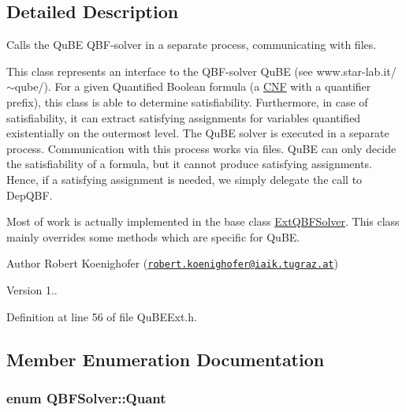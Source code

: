 \subsection{Detailed Description}
Calls the Qu\-B\-E Q\-B\-F-\/solver in a separate process, communicating with files. 

This class represents an interface to the Q\-B\-F-\/solver Qu\-B\-E (see www.\-star-\/lab.\-it/$\sim$qube/). For a given Quantified Boolean formula (a \hyperlink{classCNF}{C\-N\-F} with a quantifier prefix), this class is able to determine satisfiability. Furthermore, in case of satisfiability, it can extract satisfying assignments for variables quantified existentially on the outermost level. The Qu\-B\-E solver is executed in a separate process. Communication with this process works via files. Qu\-B\-E can only decide the satisfiability of a formula, but it cannot produce satisfying assignments. Hence, if a satisfying assignment is needed, we simply delegate the call to Dep\-Q\-B\-F.

Most of work is actually implemented in the base class \hyperlink{classExtQBFSolver}{Ext\-Q\-B\-F\-Solver}. This class mainly overrides some methods which are specific for Qu\-B\-E.

\begin{DoxyAuthor}{Author}
Robert Koenighofer (\href{mailto:robert.koenighofer@iaik.tugraz.at}{\tt robert.\-koenighofer@iaik.\-tugraz.\-at}) 
\end{DoxyAuthor}
\begin{DoxyVersion}{Version}
1.. 
\end{DoxyVersion}


Definition at line 56 of file Qu\-B\-E\-Ext.\-h.



\subsection{Member Enumeration Documentation}
\hypertarget{classQBFSolver_ac091e263cb55286cc07b2451bcf4d3c7}{
\subsubsection[{Quant}]{\setlength{\rightskip}{0pt plus 5cm}enum {\bf Q\-B\-F\-Solver\-::\-Quant}\hspace{0.3cm}{\ttfamily [inherited]}}}\label{classQBFSolver_ac091e263cb55286cc07b2451bcf4d3c7}


